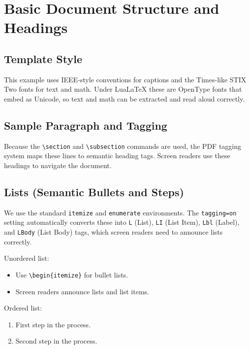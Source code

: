 \documentclass[11pt]{article}
\begin{document}
\section{Basic Document Structure and Headings}

\subsection{Template Style}
This example uses IEEE-style conventions for captions and the Times-like STIX Two fonts for text and math. Under LuaLaTeX these are OpenType fonts that embed as Unicode, so text and math can be extracted and read aloud correctly.

\subsection{Sample Paragraph and Tagging}
Because the \verb|\section| and \verb|\subsection| commands are used, the PDF tagging system maps these lines to semantic heading tags. Screen readers use these headings to navigate the document.

\subsection{Lists (Semantic Bullets and Steps)}
We use the standard \verb|itemize| and \verb|enumerate| environments. The \texttt{tagging=on} setting automatically converts these into \texttt{L} (List), \texttt{LI} (List Item), \texttt{Lbl} (Label), and \texttt{LBody} (List Body) tags, which screen readers need to announce lists correctly.

Unordered list:
\begin{itemize}
  \item Use \verb|\begin{itemize}| for bullet lists.
  \item Screen readers announce lists and list items.
\end{itemize}

Ordered list:
\begin{enumerate}
  \item First step in the process.
  \item Second step in the process.
\end{enumerate}
\end{document}
